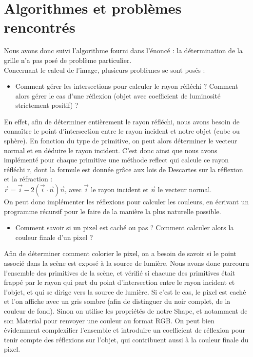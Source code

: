 \documentclass[a4paper,oneside,12pt,titlepage]{article}
\begin{document}
\begin{sloppypar}
\newpage

\section{Algorithmes et problèmes rencontrés}

Nous avons donc suivi l’algorithme fourni dans l’énoncé : la détermination de la grille n’a pas posé de problème particulier. \\[6pt] 

Concernant le calcul de l’image, plusieurs problèmes se sont posés :
\begin{itemize}
    \item Comment gérer les intersections pour calculer le rayon réfléchi ? Comment alors gérer le cas d’une réflexion (objet avec coefficient de luminosité strictement positif) ?
\end{itemize}


En effet, afin de déterminer entièrement le rayon réfléchi, nous avons besoin de connaître le point d’intersection entre le rayon incident et notre objet (cube ou sphère). En fonction du type de primitive, on peut alors déterminer le vecteur normal et en déduire le rayon incident. C’est donc ainsi que nous avons implémenté pour chaque primitive une méthode reflect qui calcule ce rayon réfléchi r, dont la formule est donnée grâce aux lois de Descartes sur la réflexion et la réfraction : \\[2pt] 

$\vec{r} = \vec{i} - 2(\vec{i} \cdot \vec{n})\vec{n}$, avec $\vec{i}$ le rayon incident et $\vec{n}$ le vecteur normal. \\[2pt] 

On peut donc implémenter les réflexions pour calculer les couleurs, en écrivant un programme récursif pour le faire de la manière la plus naturelle possible.

\begin{itemize}
    \item Comment savoir si un pixel est caché ou pas ? Comment calculer alors la couleur finale d’un pixel ?
\end{itemize}

Afin de déterminer comment colorier le pixel, on a besoin de savoir si le point associé dans la scène est exposé à la source de lumière. Nous avons donc parcouru l’ensemble des primitives de la scène, et vérifié si chacune des primitives était frappé par le rayon qui part du point d’intersection entre le rayon incident et l’objet, et qui se dirige vers la source de lumière. Si c’est le cas, le pixel est caché et l’on affiche avec un gris sombre (afin de distinguer du noir complet, de la couleur de fond). Sinon on utilise les propriétés de notre Shape, et notamment de son Material pour renvoyer une couleur au format RGB. On peut bien évidemment complexifier l’ensemble et introduire un coefficient de réflexion pour tenir compte des réflexions sur l’objet, qui contribuent aussi à la couleur finale du pixel.\\[6pt]


\end{sloppypar}
\end{document}
